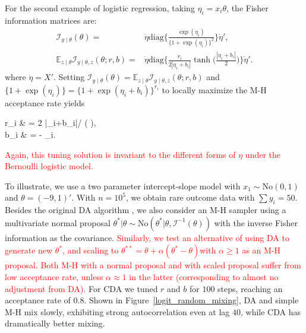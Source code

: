 \documentclass[11pt]{article}
\newcommand{\leo}[1]{{\textcolor{red}{#1}}}
\newcommand{\be}{\begin{equs}}
\newcommand{\ee}{\end{equs}}
\newcommand{\bb}[1]{\mathbb{#1}}
\newcommand{\mc}[1]{\mathcal{#1}}
\newcommand{\No}{\text{No}}
\newcommand{\diag}{\text{diag}}
\begin{document}
 
For the second example of logistic regression, taking $\eta_i=x_i\theta$, the Fisher information matrices
are:
 \begin{eqnarray}
\mc I_{y\mid \theta}({\theta}) =&  \dot\eta \diag\bigg\{\frac{\exp(\eta_i)}{ \{1+\exp(\eta_i)\} ^2}\bigg\} \dot\eta', \nonumber \\
\bb E_{z\mid \theta}\mc I_{y\mid \theta,z}({\theta};r,b)= & \dot\eta  \diag\bigg\{ \frac{r_i}{2 |\eta_i+b_i|}\tanh\Big(\frac{|\eta_i+b_i|}{2} \Big)\bigg\} \dot\eta' .  \nonumber
\end{eqnarray}
where $\dot\eta=X'$. 
Setting $\mc I_{y\mid \theta}({\theta})=\bb E_{z\mid \theta}\mc I_{y\mid \theta,z}({\theta};r,b)$ and $ \{1+\exp(\eta_i)\}  = \{1+\exp(\eta_i+b_i)\}^{r_i}$
to locally maximize the M-H acceptance rate yields
\be
r_i & = {2 |\eta_i+b_i|}/ \tanh\Big( \Big),
\\ b_i & =  - \eta_i.
\ee
\leo{Again, this tuning solution is invariant to the different forms of $\eta$ under
the Bernoulli logistic model.}

To illustrate, we use a two parameter intercept-slope model with $x_1\sim \No(0,1)$ and $\theta=(-9,1)'$. With $n= 10^5$, we obtain rare outcome data with 
$\sum y_{i} = 50 $.  Besides the original DA algorithm  \citep{polson2013bayesian}, we also consider an M-H sampler using a multivariate normal proposal $\theta^*|\theta \sim \No(\theta^*| \theta, {\mc I}^{-1}(\theta))$ with the inverse Fisher information as the covariance. \leo{Similarly, we test an alternative of using DA to generate new $\theta^*$, and scaling to $\theta^{**}=\theta+\alpha(\theta^{*}-\theta)$with $\alpha\ge 1$ as an M-H proposal. Both M-H with a normal proposal and with scaled proposal suffer from low acceptance rate, unless $\alpha\approx 1$ in the latter (corresponding to almost no adjustment from DA).} For CDA we tuned $r$ and $b$ for $100$ steps, reaching an acceptance rate of $0.8$.  Shown in Figure~\ref{logit_random_mixing}, DA and simple M-H mix slowly, exhibiting strong autocorrelation even at lag $40$, while CDA has dramatically better mixing.
\end{document}
